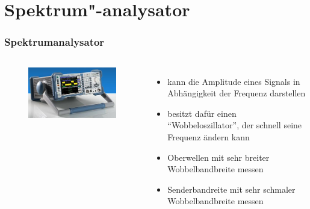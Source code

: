 \section*{Spektrum"-analysator}
\begin{frame}
  \frametitle{Spektrumanalysator}
  \begin{columns}
    \begin{center}
      \begin{figure}
        \includegraphics[width=\textwidth,height=.75\textheight,keepaspectratio]{a16/Spektrumanalysator.jpg}
      \end{figure}
    \end{center}
    \begin{itemize}
      \item kann die Amplitude eines Signals in Abhängigkeit der Frequenz darstellen
      \item besitzt dafür einen ``Wobbeloszillator'', der schnell seine Frequenz ändern kann
      \item Oberwellen mit sehr breiter Wobbelbandbreite messen
      \item Senderbandreite mit sehr schmaler Wobbelbandbreite messen
    \end{itemize}
  \end{columns}
\end{frame}

